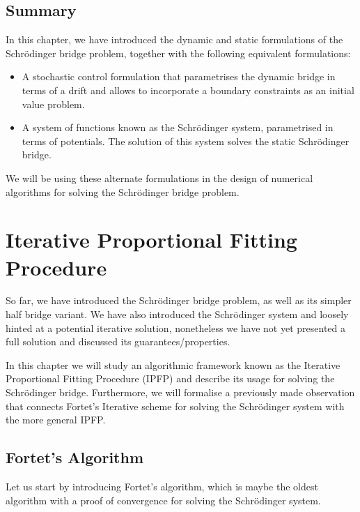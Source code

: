 \documentclass[a4paper,12pt,twoside,openright]{report}
\theoremstyle{definition}
\begin{document}
\section{Summary}
 In this chapter, we have introduced the dynamic and static formulations of the Schrödinger bridge problem, together with the following equivalent formulations:
 \begin{itemize}
     \item A stochastic control formulation that parametrises the dynamic bridge in terms of a drift and allows to incorporate a boundary constraints as an initial value problem.
     \item A system of functions known as the Schrödinger system, parametrised in terms of potentials. The solution of this system solves the static Schrödinger bridge. 
 \end{itemize}
 We will be using these alternate formulations in the design of numerical algorithms for solving the Schrödinger bridge problem.
\chapter{Iterative Proportional Fitting Procedure}

So far, we have introduced the Schrödinger bridge problem, as well as its simpler half bridge variant. We have also introduced the Schrödinger system and loosely hinted at a potential iterative solution, nonetheless we have not yet presented a full solution and discussed its guarantees/properties.

In this chapter we will study an algorithmic framework known as the Iterative Proportional Fitting Procedure (IPFP) \citep{csiszar1975divergence, kullback1968probability, ruschendorf1995convergence,cramer2000probability} and describe its usage for solving the Schrödinger bridge. Furthermore, we will formalise a previously made observation that connects Fortet's Iterative scheme \citep{fortet1940resolution} for solving the Schrödinger system with the more general IPFP. 

\section{Fortet's Algorithm}

Let us start by introducing Fortet's algorithm, which is maybe the oldest algorithm with a proof of convergence \citep{fortet1940resolution} for solving the Schrödinger system.
\end{document}
